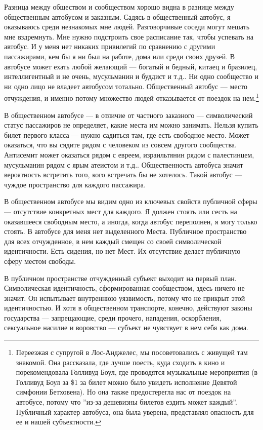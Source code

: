 \documentclass[12pt]{book}
\begin{document}
Разница между обществом и сообществом хорошо видна в разнице между общественным автобусом и заказным. Садясь в общественный автобус, я оказываюсь среди незнакомых мне людей. Разговорчивые соседи могут мешать мне вздремнуть. Мне нужно подстроить свое расписание так, чтобы успевать на автобус. И у меня нет никаких привилегий по сравнению с другими пассажирами, кем бы я ни был на работе, дома или среди своих друзей. В автобусе может ехать любой желающий --- богатый и бедный, китаец и бразилец, интеллигентный и не очень, мусульманин и буддист и т.д.. Ни одно сообщество и ни одно лицо не владеет автобусом тотально. Общественный автобус --- место отчуждения, и именно потому множество людей отказывается от поездок на нем.\footnote{Переезжая с супругой в Лос-Анджелес, мы посоветовались с живущей там знакомой. Она рассказала, где лучше поесть, куда сходить в кино и порекомендовала Голливуд Боул, где проводятся музыкальные мероприятия (в Голливуд Боул за \$1 за билет можно было увидеть исполнение Девятой симфонии Бетховена). Но она также предостерегла нас от поездок на автобусе, потому что ''из-за дешевизны билетов ездить может каждый''. Публичный характер автобуса, она была уверена, представлял опасность для ее и нашей субъектности.}

В общественном автобусе --- в отличие от частного заказного --- символический статус пассажиров не определяет, какие места им можно занимать. Нельзя купить билет первого класса --- нужно садиться там, где есть свободное место. Может оказаться, что вы сядите рядом с человеком из совсем другого сообщества. Антисемит может оказаться рядом с евреем, израильтянин рядом с палестинцем, мусульманин рядом с ярым атеистом и т.д.. Общественность автобуса значит вероятность встретить того, кого встречать бы не хотелось. Такой автобус --- чуждое пространство для каждого пассажира.

В общественном автобусе мы видим одно из ключевых свойств публичной сферы --- отсутствие конкретных мест для каждого. Я должен стоять или сесть на оказавшееся свободным место, а иногда, когда автобус переполнен, я могу только стоять. В автобусе для меня нет выделенного Места. Публичное пространство для всех отчужденное, в нем каждый смещен со своей символической идентичности. Есть сидения, но нет Мест. Их отсутствие делает публичную сферу местом свободы.

В публичном пространстве отчужденный субъект выходит на первый план. Символическая идентичность, сформированная сообществом, здесь ничего не значит. Он испытывает внутреннюю уязвимость, потому что не прикрыт этой идентичностью. И хотя в общественном транспорте, конечно, действуют законы государства --- запрещающие, среди прочего, нападения, оскорбления, сексуальное насилие и воровство --- субъект не чувствует в нем себя как дома.
\end{document}
